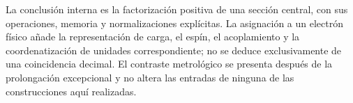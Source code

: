 La conclusión interna es la factorización positiva de una sección
central, con sus operaciones, memoria y normalizaciones explícitas. La
asignación a un electrón físico añade la representación de carga, el
espín, el acoplamiento y la coordenatización de unidades correspondiente; no se
deduce exclusivamente de una coincidencia decimal. El contraste
metrológico se presenta después de la prolongación excepcional y no altera
las entradas de ninguna de las construcciones aquí realizadas.




